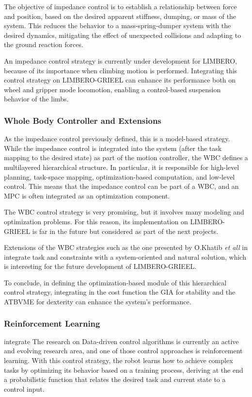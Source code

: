 The objective of impedance control is to establish a relationship between force and position, based on the desired apparent stiffness, dumping, or mass of the system\cite{ImpedanceControl}. This reduces the behavior to a mass-spring-dumper system with the desired dynamics, mitigating the effect of unexpected collisions and adapting to the ground reaction forces. 

An impedance control strategy is currently under development for LIMBERO, because of its importance when climbing motion is performed. Integrating this control strategy on LIMBERO-GRIEEL can enhance its performance both on wheel and gripper mode locomotion, enabling a control-based suspension behavior of the limbs. 

\subsubsection{Whole Body Controller and Extensions}
As the impedance control previously defined, this is a model-based strategy. 
While the impedance control is integrated into the system (after the task mapping to the desired state)  as part of the motion controller, the WBC defines a multilayered hierarchical structure. 
In particular, it is responsible for high-level planning, task-space mapping, optimization-based computation, and low-level control. This means that the impedance control can be part of a WBC, and an MPC is often integrated as an optimization component\cite{AnymalDocThesis}. 

The WBC control strategy is very promising, but it involves many modeling and optimization problems\cite{AnymalDocThesis}\cite{WBCFocchi}\cite{WBCQuadruped}. For this reason, its implementation on LIMBERO-GRIEEL is far in the future but considered as part of the next projects. 

 Extensions of the WBC strategies such as the one presented by O.Khatib \textit{et all} in \cite{KhatibConstrainedConsistentTaskOrientedWBC} integrate task and constraints with a system-oriented and natural solution, which is interesting for the future development of LIMBERO-GRIEEL. 

To conclude, in defining the optimization-based module of this hierarchical control strategy, integrating in the cost function the GIA for stability and the ATBVME for dexterity can enhance the system's performance. 

\subsubsection{Reinforcement Learning}
integrate
The research on Data-driven control algorithms is currently an active and evolving research area, and one of those control approaches is reinforcement learning\cite{RL_overview}\cite{InteligentControlMultiLegged}\cite{RobotSimulationRL}\cite{RL_wheelLegged}.   
With this control strategy, the robot learns how to achieve complex tasks by optimizing its behavior based on a training process, deriving at the end a probabilistic function that relates the desired task and current state to a control input. 


